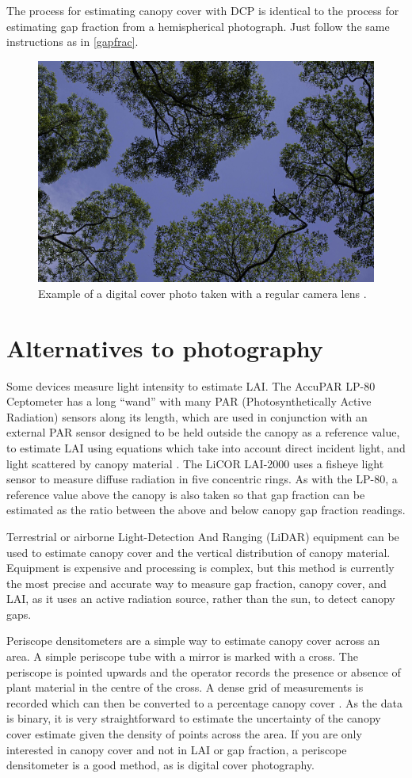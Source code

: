 \documentclass[11pt,a4paper]{article}
\begin{document}
The process for estimating canopy cover with DCP is identical to the process for estimating gap fraction from a hemispherical photograph. Just follow the same instructions as in \autoref{gapfrac}.

\begin{figure}[H]
	\includegraphics[width=0.6\linewidth]{dcp}
	\caption{Example of a digital cover photo taken with a regular camera lens \citep{dcp2010}.}
	\label{dcp}
\end{figure}

\section{Alternatives to photography}

Some devices measure light intensity to estimate LAI. The AccuPAR LP-80 Ceptometer \citep{accupar2013} has a long ``wand'' with many PAR (Photosynthetically Active Radiation) sensors along its length, which are used in conjunction with an external PAR sensor designed to be held outside the canopy as a reference value, to estimate LAI using equations which take into account direct incident light, and light scattered by canopy material \citep{Goudriaan1988}. The LiCOR LAI-2000 \citep{lai2000, Cutini1998} uses a fisheye light sensor to measure diffuse radiation in five concentric rings. As with the LP-80, a reference value above the canopy is also taken so that gap fraction can be estimated as the ratio between the above and below canopy gap fraction readings. 

Terrestrial or airborne Light-Detection And Ranging (LiDAR) equipment can be used to estimate canopy cover and the vertical distribution of canopy material. Equipment is expensive and processing is complex, but this method is currently the most precise and accurate \citep{Seidel2011} way to measure gap fraction, canopy cover, and LAI, as it uses an active radiation source, rather than the sun, to detect canopy gaps. 

Periscope densitometers are a simple way to estimate canopy cover across an area. A simple periscope tube with a mirror is marked with a cross. The periscope is pointed upwards and the operator records the presence or absence of plant material in the centre of the cross. A dense grid of measurements is recorded which can then be converted to a percentage canopy cover \citep{GRS}. As the data is binary, it is very straightforward to estimate the uncertainty of the canopy cover estimate given the density of points across the area. If you are only interested in canopy cover and not in LAI or gap fraction, a periscope densitometer is a good method, as is digital cover photography.
\end{document}
